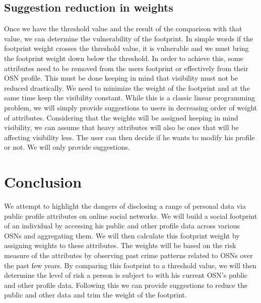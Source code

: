 \documentclass[conference]{IEEEtran}
\begin{document}
\subsection{Suggestion reduction in weights}
Once we have the threshold value and the result of the comparison with that value, we can determine the vulnerability of the footprint. In simple words if the footprint weight crosses the threshold value, it is vulnerable and we must bring the footprint weight down below the threshold. In order to achieve this, some attributes need to be removed from the users footprint or effectively from their OSN profile. This must be done keeping in mind that visibility must not be reduced drastically. We need to minimize the weight of the footprint and at the same time keep the visibility constant. While this is a classic linear programming problem, we will simply provide suggestions to users in decreasing order of weight of attributes. Considering that the weights will be assigned keeping in mind visibility, we can assume that heavy attributes will also be ones that will be affecting visibility less. The user can then decide if he wants to modify his profile or not. We will only provide suggestions.

\section{Conclusion}
We attempt to highlight the dangers of disclosing a range of personal data via public profile attributes on online social networks. We will build a social footprint of an individual by accessing his public and other profile data across various OSNs and aggregating them. We will then calculate this footprint weight by assigning weights to these attributes. The weights will be based on the risk measure of the attributes by observing past crime patterns related to OSNs over the past few years. By comparing this footprint to a threshold value, we will then determine the level of risk a person is subject to with his current OSN's public and other profile data. Following this we can provide suggestions to reduce the public and other data and trim the weight of the footprint.

\end{document}
